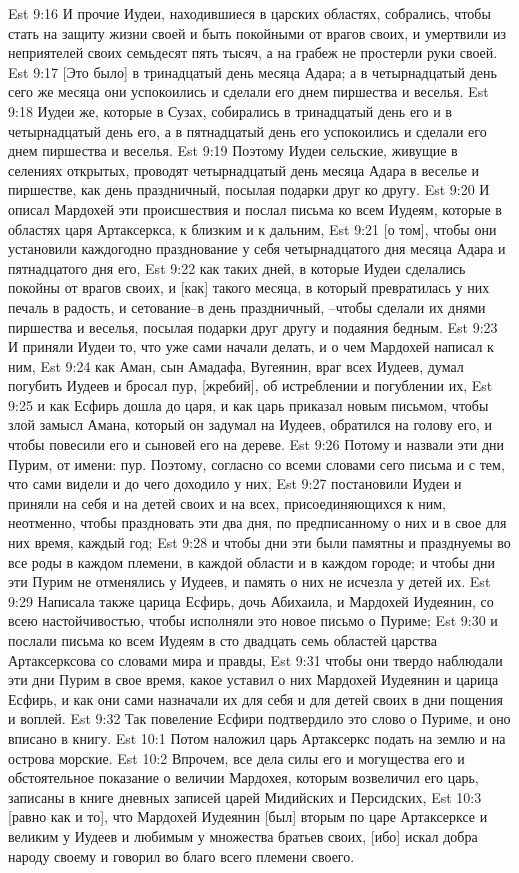 Est 9:16  И прочие Иудеи, находившиеся в царских областях, собрались, чтобы стать на защиту жизни своей и быть покойными от врагов своих, и умертвили из неприятелей своих семьдесят пять тысяч, а на грабеж не простерли руки своей.
Est 9:17  [Это было] в тринадцатый день месяца Адара; а в четырнадцатый день сего же месяца они успокоились и сделали его днем пиршества и веселья.
Est 9:18  Иудеи же, которые в Сузах, собирались в тринадцатый день его и в четырнадцатый день его, а в пятнадцатый день его успокоились и сделали его днем пиршества и веселья.
Est 9:19  Поэтому Иудеи сельские, живущие в селениях открытых, проводят четырнадцатый день месяца Адара в веселье и пиршестве, как день праздничный, посылая подарки друг ко другу.
Est 9:20  И описал Мардохей эти происшествия и послал письма ко всем Иудеям, которые в областях царя Артаксеркса, к близким и к дальним,
Est 9:21  [о том], чтобы они установили каждогодно празднование у себя четырнадцатого дня месяца Адара и пятнадцатого дня его,
Est 9:22  как таких дней, в которые Иудеи сделались покойны от врагов своих, и [как] такого месяца, в который превратилась у них печаль в радость, и сетование--в день праздничный, --чтобы сделали их днями пиршества и веселья, посылая подарки друг другу и подаяния бедным.
Est 9:23  И приняли Иудеи то, что уже сами начали делать, и о чем Мардохей написал к ним,
Est 9:24  как Аман, сын Амадафа, Вугеянин, враг всех Иудеев, думал погубить Иудеев и бросал пур, [жребий], об истреблении и погублении их,
Est 9:25  и как Есфирь дошла до царя, и как царь приказал новым письмом, чтобы злой замысл Амана, который он задумал на Иудеев, обратился на голову его, и чтобы повесили его и сыновей его на дереве.
Est 9:26  Потому и назвали эти дни Пурим, от имени: пур. Поэтому, согласно со всеми словами сего письма и с тем, что сами видели и до чего доходило у них,
Est 9:27  постановили Иудеи и приняли на себя и на детей своих и на всех, присоединяющихся к ним, неотменно, чтобы праздновать эти два дня, по предписанному о них и в свое для них время, каждый год;
Est 9:28  и чтобы дни эти были памятны и празднуемы во все роды в каждом племени, в каждой области и в каждом городе; и чтобы дни эти Пурим не отменялись у Иудеев, и память о них не исчезла у детей их.
Est 9:29  Написала также царица Есфирь, дочь Абихаила, и Мардохей Иудеянин, со всею настойчивостью, чтобы исполняли это новое письмо о Пуриме;
Est 9:30  и послали письма ко всем Иудеям в сто двадцать семь областей царства Артаксерксова со словами мира и правды,
Est 9:31  чтобы они твердо наблюдали эти дни Пурим в свое время, какое уставил о них Мардохей Иудеянин и царица Есфирь, и как они сами назначали их для себя и для детей своих в дни пощения и воплей.
Est 9:32  Так повеление Есфири подтвердило это слово о Пуриме, и оно вписано в книгу.
Est 10:1  Потом наложил царь Артаксеркс подать на землю и на острова морские.
Est 10:2  Впрочем, все дела силы его и могущества его и обстоятельное показание о величии Мардохея, которым возвеличил его царь, записаны в книге дневных записей царей Мидийских и Персидских,
Est 10:3  [равно как и то], что Мардохей Иудеянин [был] вторым по царе Артаксерксе и великим у Иудеев и любимым у множества братьев своих, [ибо] искал добра народу своему и говорил во благо всего племени своего.


